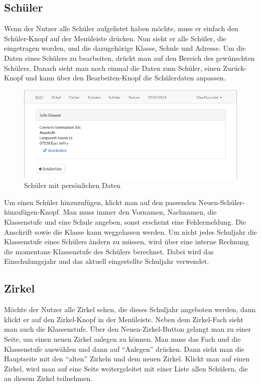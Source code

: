 \subsection{Schüler}
Wenn der Nutzer alle Schüler aufgelistet haben möchte, muss er einfach den Schüler-Knopf auf der Menüleiste drücken. Nun sieht er alle Schüler, die eingetragen worden, und die dazugehörige Klasse, Schule und Adresse. Um die Daten eines Schülers zu bearbeiten, drückt man auf den Bereich des gewünschten Schülers. Danach sieht man noch einmal die Daten zum Schüler, einen Zurück-Knopf und kann über den Bearbeiten-Knopf die Schülerdaten anpassen.

\begin{figure}[h]
	\centering
	\includegraphics[scale=.5]{bilder/Schueler_Daten.png}
	\caption{Schüler mit persönlichen Daten}
\end{figure}

Um einen Schüler hinzuzufügen, klickt man auf den passenden Neuen-Schüler-hinzufügen-Knopf. Man muss immer den Vornamen, Nachnamen, die Klassenstufe und eine Schule angeben, sonst erscheint eine Fehlermeldung. Die Anschrift sowie die Klasse kann weggelassen werden. Um nicht jedes Schuljahr die Klassenstufe eines Schülers ändern zu müssen, wird über eine interne Rechnung die momentane Klassenstufe des Schülers berechnet. Dabei wird das Einschulungsjahr und das aktuell eingestellte Schuljahr verwendet.

\newpage \subsection{Zirkel}
Möchte der Nutzer alle Zirkel sehen, die dieses Schuljahr angeboten werden, dann klickt er auf den Zirkel-Knopf in der Menüleiste. Neben dem Zirkel-Fach sieht man auch die Klassenstufe. Über den Neuen-Zirkel-Button gelangt man zu einer Seite, um einen neuen Zirkel anlegen zu können. Man muss das Fach und die Klassenstufe auswählen und dann auf "`Anlegen"' drücken. Dann sieht man die Hauptseite mit den "`alten"' Zirkeln und dem neuen Zirkel. Klickt man auf einen Zirkel, wird man auf eine Seite weitergeleitet mit einer Liste allen Schülern, die an diesem Zirkel teilnehmen. 

